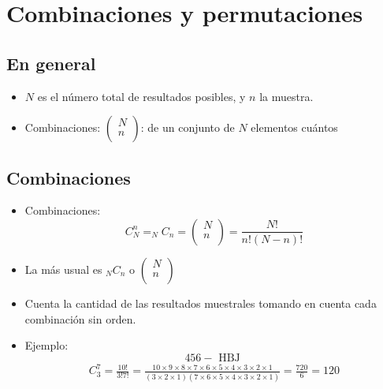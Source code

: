 \section{Combinaciones y permutaciones}
\subsection{En general}
\begin{itemize}
    \item $N$ es el número total de resultados posibles, y $n$ la muestra.
    \item Combinaciones: $\left(\begin{matrix} N \\ n \\ \end{matrix}\right)$: de un conjunto de $N$ elementos cuántos
\end{itemize}

\subsection{Combinaciones}
\begin{itemize}
    \item Combinaciones:
        \[
          C_N^n = _NC_n = \left( \begin{matrix}
              N \\ 
              n \\ 
          \end{matrix} \right) = \frac{N!}{n!(N-n)!} 
        \]
    
    \item La más usual es $_NC_n$ o $\left(\begin{matrix}
        N \\ 
        n \\ 
    \end{matrix}\right)$ 

    
    \item Cuenta la cantidad de las resultados muestrales tomando en cuenta cada combinación sin orden.
    \item Ejemplo:
        \[
          456-\text{  HBJ  }
        \]
        \begin{align*}
            C_3^7 = \frac{10!}{3!7!} = \frac{10\times 9 \times 8 \times 7 \times 6 \times 5 \times 4 \times 3 \times 2 \times 1}{(3\times 2 \times  1 )(7 \times 6 \times 5 \times 4 \times 3 \times 2 \times 1)} = \frac{720}{6}  = 120 \\   
        \end{align*}
\end{itemize}


